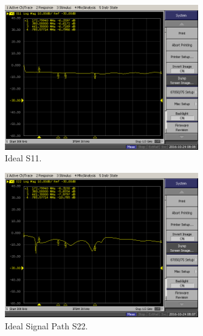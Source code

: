\documentclass[letter,12pt]{article}
\begin{document}
\begin{figure}
\begin{centering}
\includegraphics[width=0.75\textwidth]{photos/IDEAL-S11.PNG}
\par\end{centering}
\caption{Ideal S11.}
\label{ideal-S11}
\end{figure}

\begin{figure}
\begin{centering}
\includegraphics[width=0.75\textwidth]{photos/IDEAL-S22-SIG.PNG}
\par\end{centering}
\caption{Ideal Signal Path S22.}
\label{ideal-sig-S22}
\end{figure}
\end{document}
